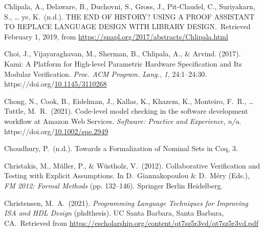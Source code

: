 \documentclass[12pt,twoside]{article}
\begin{document}
{\begin{thebibliography}{1079}
\mdbibitemlabel{}Chlipala, A., Delaware, B., Duchovni, S., Gross, J., Pit-Claudel, C., Suriyakarn, S., … ye, K.~(n.d.). THE END OF HISTORY? USING A PROOF ASSISTANT TO REPLACE LANGUAGE DESIGN WITH LIBRARY DESIGN.~Retrieved February 1, 2019, from \href{https://snapl.org/2017/abstracts/Chlipala.html}{{\ttfamily https://\hspace{0pt}snapl.\hspace{0pt}org/\hspace{0pt}2017/\hspace{0pt}abstracts/\hspace{0pt}Chlipala.\hspace{0pt}html}}%

\mdbibitemlabel{}Choi, J., Vijayaraghavan, M., Sherman, B., Chlipala, A., \& Arvind. (2017). Kami: A Platform for High-level Parametric Hardware Specification and Its Modular Verification. \emph{Proc. ACM Program. Lang.}, \emph{1}, 24:1–24:30. https://doi.org/\href{https://dx.doi.org/10.1145/3110268}{10.1145/3110268}%

\mdbibitemlabel{}Chong, N., Cook, B., Eidelman, J., Kallas, K., Khazem, K., Monteiro, F.~R., … Tuttle, M.~R.~(2021). Code-level model checking in the software development workflow at Amazon Web Services. \emph{Software: Practice and Experience}, \emph{n/a}. https://doi.org/\href{https://dx.doi.org/10.1002/spe.2949}{10.1002/spe.2949}%

\mdbibitemlabel{}Choudhury, P.~(n.d.). Towards a Formalization of Nominal Sets in Coq, 3.%

\mdbibitemlabel{}Christakis, M., Müller, P., \& Wüstholz, V.~(2012). Collaborative Verification and Testing with Explicit Assumptions. In D.~Giannakopoulou \& D.~Méry (Eds.), \emph{FM 2012: Formal Methods} (pp. 132–146). Springer Berlin Heidelberg.%

\mdbibitemlabel{}Christensen, M.~A.~(2021). \emph{Programming Language Techniques for Improving ISA and HDL Design} (phdthesis). UC Santa Barbara, Santa Barbara, CA.~Retrieved from \href{https://escholarship.org/content/qt7sz5r3vd/qt7sz5r3vd.pdf}{{\ttfamily https://\hspace{0pt}escholarship.\hspace{0pt}org/\hspace{0pt}content/\hspace{0pt}qt7sz5r3vd/\hspace{0pt}qt7sz5r3vd.\hspace{0pt}pdf}}%


\end{thebibliography}}
\end{document}
